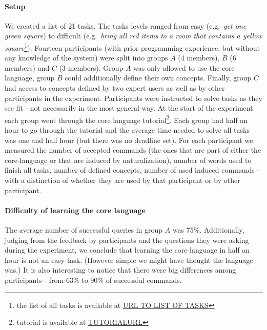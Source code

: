 \paragraph*{\textbf{Setup}} We created a list of 21 tasks. The tasks levels ranged from easy (e.g.\  \emph{get one green square}) to difficult (e.g.\ \emph{bring all red items to a room that contains a yellow square}\footnote{the list of all tasks is available at \url{URL TO LIST OF TASKS}}). Fourteen participants (with prior programming experience, but without any knowledge of the system) were split into groups $A$ (4 members), $B$ (6 members) and $C$ (3 members). Group $A$ was only allowed to use the core language, group $B$ could additionally define their own concepts. Finally, group $C$ had access to concepts defined by two expert users as well as by other participants in the experiment. Participants were instructed to solve tasks as they see fit - not necessarily in the most general way. At the start of the experiment each group went through the core language tutorial\footnote{tutorial is available at \url{TUTORIALURL}}. Each group had half an hour to go through the tutorial and the average time needed to solve all tasks was one and half hour (but there was no deadline set). For each participant we measured the number of accepted commands (the ones that are part of either the core-language or that are induced by naturalization), number of words used to finish all tasks, number of defined concepts, number of used induced commands - with a distinction of whether they are used by that participant or by other participant.
\paragraph*{\textbf{Difficulty of learning the core language}} The average number of successful queries in group $A$ was 75\%. Additionally, judging from the feedback by participants and the questions they were asking during the experiment, we conclude that learning the core-language in half an hour is not an easy task. (However simple we might have thought the language was.) It is also interesting to notice that there were big differences among participants - from 63\% to 90\% of successful commands.
